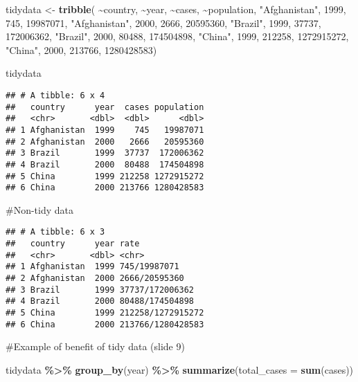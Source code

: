 \documentclass[
]{article}
\newenvironment{Shaded}{\begin{snugshade}}{\end{snugshade}}
\newcommand{\AttributeTok}[1]{\textcolor[rgb]{0.13,0.29,0.53}{#1}}
\newcommand{\DecValTok}[1]{\textcolor[rgb]{0.00,0.00,0.81}{#1}}
\newcommand{\FunctionTok}[1]{\textcolor[rgb]{0.13,0.29,0.53}{\textbf{#1}}}
\newcommand{\NormalTok}[1]{#1}
\newcommand{\OtherTok}[1]{\textcolor[rgb]{0.56,0.35,0.01}{#1}}
\newcommand{\SpecialCharTok}[1]{\textcolor[rgb]{0.81,0.36,0.00}{\textbf{#1}}}
\newcommand{\StringTok}[1]{\textcolor[rgb]{0.31,0.60,0.02}{#1}}
\begin{document}
\begin{Shaded}
\begin{Highlighting}[]
\NormalTok{tidydata }\OtherTok{\textless{}{-}} \FunctionTok{tribble}\NormalTok{( }\SpecialCharTok{\textasciitilde{}}\NormalTok{country, }\SpecialCharTok{\textasciitilde{}}\NormalTok{year, }\SpecialCharTok{\textasciitilde{}}\NormalTok{cases, }\SpecialCharTok{\textasciitilde{}}\NormalTok{population, }\StringTok{"Afghanistan"}\NormalTok{, }\DecValTok{1999}\NormalTok{, }\DecValTok{745}\NormalTok{, }\DecValTok{19987071}\NormalTok{,}
\StringTok{"Afghanistan"}\NormalTok{, }\DecValTok{2000}\NormalTok{, }\DecValTok{2666}\NormalTok{, }\DecValTok{20595360}\NormalTok{,}
\StringTok{"Brazil"}\NormalTok{, }\DecValTok{1999}\NormalTok{, }\DecValTok{37737}\NormalTok{, }\DecValTok{172006362}\NormalTok{,}
\StringTok{"Brazil"}\NormalTok{, }\DecValTok{2000}\NormalTok{, }\DecValTok{80488}\NormalTok{, }\DecValTok{174504898}\NormalTok{,}
\StringTok{"China"}\NormalTok{, }\DecValTok{1999}\NormalTok{, }\DecValTok{212258}\NormalTok{, }\DecValTok{1272915272}\NormalTok{,}
\StringTok{"China"}\NormalTok{, }\DecValTok{2000}\NormalTok{, }\DecValTok{213766}\NormalTok{, }\DecValTok{1280428583}\NormalTok{)}

\NormalTok{tidydata}
\end{Highlighting}
\end{Shaded}

\begin{verbatim}
## # A tibble: 6 x 4
##   country      year  cases population
##   <chr>       <dbl>  <dbl>      <dbl>
## 1 Afghanistan  1999    745   19987071
## 2 Afghanistan  2000   2666   20595360
## 3 Brazil       1999  37737  172006362
## 4 Brazil       2000  80488  174504898
## 5 China        1999 212258 1272915272
## 6 China        2000 213766 1280428583
\end{verbatim}

\#Non-tidy data

\begin{verbatim}
## # A tibble: 6 x 3
##   country      year rate             
##   <chr>       <dbl> <chr>            
## 1 Afghanistan  1999 745/19987071     
## 2 Afghanistan  2000 2666/20595360    
## 3 Brazil       1999 37737/172006362  
## 4 Brazil       2000 80488/174504898  
## 5 China        1999 212258/1272915272
## 6 China        2000 213766/1280428583
\end{verbatim}

\#Example of benefit of tidy data (slide 9)

\begin{Shaded}
\begin{Highlighting}[]
\NormalTok{tidydata }\SpecialCharTok{\%\textgreater{}\%}
 \FunctionTok{group\_by}\NormalTok{(year) }\SpecialCharTok{\%\textgreater{}\%}
 \FunctionTok{summarize}\NormalTok{(}\AttributeTok{total\_cases =} \FunctionTok{sum}\NormalTok{(cases))}
\end{Highlighting}
\end{Shaded}
\end{document}
